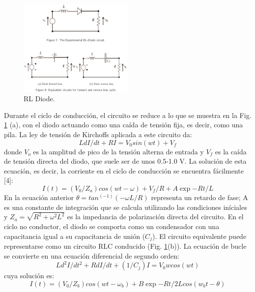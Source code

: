 \documentclass[%
 reprint,
 amsmath,amssymb,
 aps,
]{revtex4-2}
\begin{document}
\begin{figure}[h]
    \centering
    \includegraphics[width=0.5\textwidth]{RLDiodo/fig 1 rldiode.png}
    \caption{RL Diode.}
    \label{fig1:RL Diode}
\end{figure}

Durante el ciclo de conducción, el circuito se reduce a lo que se muestra en la Fig. \ref{fig1:RL Diode} (a), con el diodo actuando como una caída de tensión fija, es decir, como una pila. La ley de tensión de Kirchoffs aplicada a este circuito da:
\begin{equation}
    LdI/dt + RI = V_{0}sin(wt) + V_f
\end{equation}
donde $V_o$ es la amplitud de pico de la tensión alterna de entrada y $V_f$ es la caída de tensión directa del diodo, que suele ser de unos 0.5-1.0 V. La solución de esta ecuación, es decir, la corriente en el ciclo de conducción se encuentra fácilmente [4]:
\begin{equation}
    I(t) = (V_{0}/Z_a)cos(wt-\omega) + V_{f}/R + A\exp{-Rt/L}
\end{equation}
En la ecuación anterior $\theta = tan^(-1)⁡(-ωL/R)$ representa un retardo de fase; A es una constante de integración que se calcula utilizando las condiciones iníciales y $Z_{a}=\sqrt{R^{2}+ω^{2}L^{2}}$ es la impedancia de polarización directa del circuito.
En el ciclo no conductor, el diodo se comporta como un condensador con una capacitancia igual a su capacitancia de unión ($C_j$). El circuito equivalente puede representarse como un circuito RLC conducido (Fig. \ref{fig1:RL Diode}(b)). La ecuación de bucle se convierte en una ecuación diferencial de segundo orden:
\begin{equation}
    Ld^{2}I/dt{^2} + RdI/dt + (1/C_{j})I = V_{0}wcos(wt)
\end{equation}
cuya solución es:
\begin{equation}
    I(t) = (V_{0}/Z_b)cos(wt-\omega_b) + B\exp{-Rt/2L}cos(w_{b}t-\theta)
\end{equation}
\end{document}
